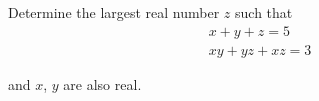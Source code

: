 Determine the largest real number $z$ such that\begin{align*}

x + y + z = 5 \\

xy + yz + xz = 3

\end{align*}

and $x$,  $y$ are also real.